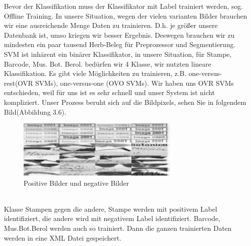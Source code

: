 \documentclass[10pt,a4paper]{report}
\begin{document}
Bevor der Klassifikation muss der Klassifikator mit Label trainiert werden, sog. Offline Training. In unsere Situation, wegen der vielen varianten Bilder brauchen wir eine ausreichende Menge Daten zu trainieren. D.h. je größer unsere Datenbank ist, umso kriegen wir besser Ergebnis. Deswegen brauchen wir zu mindesten ein paar tausend Herb-Beleg für Preprozessor und Segmentierung.
SVM ist inhärent ein binärer Klassifikator, in unsere Situation, für Stampe, Barcode, Mus. Bot. Berol. bedürfen wir 4 Klasse, wir nutzten lineare Klassifikation. Es gibt viele Möglichkeiten zu trainieren, z.B. one-versus-rest(OVR SVMs), one-versus-one (OVO SVMs). Wir haben uns OVR SVMs entschieden, weil für uns ist es sehr schnell und unser System ist nicht kompliziert. Unser Prozess beruht sich auf die Bildpixels, sehen Sie in folgendem Bild(Abbildung 3.6).\\
\begin{figure}[htbp] 
	\centering
	\includegraphics[width=0.7\textwidth]{Positivnegativ.png}
	\caption{Positive Bilder und negative Bilder}
	\label{fig:Bild 6}
\end{figure}\\
Klasse Stampen gegen die andere, Stampe werden mit positivem Label identifiziert, die andere wird mit negativem Label identifiziert. Barcode, Mus.Bot.Berol werden auch so trainiert. Dann die ganzen trainierten Daten  werden in eine XML Datei gespeichert.
\end{document}
